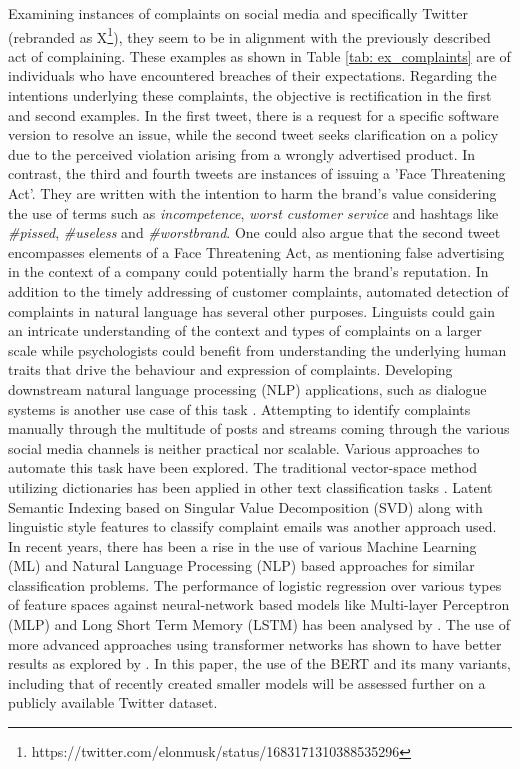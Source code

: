 Examining instances of complaints on social media and specifically Twitter (rebranded as X\footnote{https://twitter.com/elonmusk/status/1683171310388535296}), they seem to be in alignment with the previously described act of complaining. These examples as shown in Table \ref{tab: ex_complaints} are of individuals who have encountered breaches of their expectations. Regarding the intentions underlying these complaints, the objective is rectification in the first and second examples. In the first tweet, there is a request for a specific software version to resolve an issue, while the second tweet seeks clarification on a policy due to the perceived violation arising from a wrongly advertised product. In contrast, the third and fourth tweets are instances of issuing a 'Face Threatening Act'. They are written with the intention to harm the brand's value considering the use of terms such as \textit{incompetence}, \textit{worst customer service} and hashtags like \textit{\#pissed}, \textit{\#useless} and \textit{\#worstbrand}. One could also argue that the second tweet encompasses elements of a Face Threatening Act, as mentioning false advertising in the context of a company could potentially harm the brand's reputation.
\newline \newline
In addition to the timely addressing of customer complaints, automated detection of complaints in natural language has several other purposes. Linguists could gain an intricate understanding of the context and types of complaints on a larger scale while psychologists could benefit from understanding the underlying human traits that drive the behaviour and expression of complaints. Developing downstream natural language processing (NLP) applications, such as dialogue systems is another use case of this task \cite{preotiuc-pietro_automatically_2019}.
\newline \newline
Attempting to identify complaints manually through the multitude of posts and streams coming through the various social media channels is neither practical nor scalable. Various approaches to automate this task have been explored. The traditional vector-space method utilizing dictionaries has been applied in other text classification tasks \cite{liang_dictionary-based_2006}. Latent Semantic Indexing based on Singular Value Decomposition (SVD) along with linguistic style features to classify complaint emails was another approach used\cite{coussement_improving_2008}. In recent years, there has been a rise in the use of various Machine Learning (ML) and Natural Language Processing (NLP) based approaches for similar classification problems. The performance of logistic regression over various types of feature spaces against neural-network based models like Multi-layer Perceptron (MLP) and Long Short Term Memory (LSTM) has been analysed by \cite{preotiuc-pietro_automatically_2019}. The use of more advanced approaches using transformer networks has shown to have better results as explored by \cite{jin_complaint_2020}. In this paper, the use of the BERT and its many variants, including that of recently created smaller models will be assessed further on a publicly available Twitter dataset.


